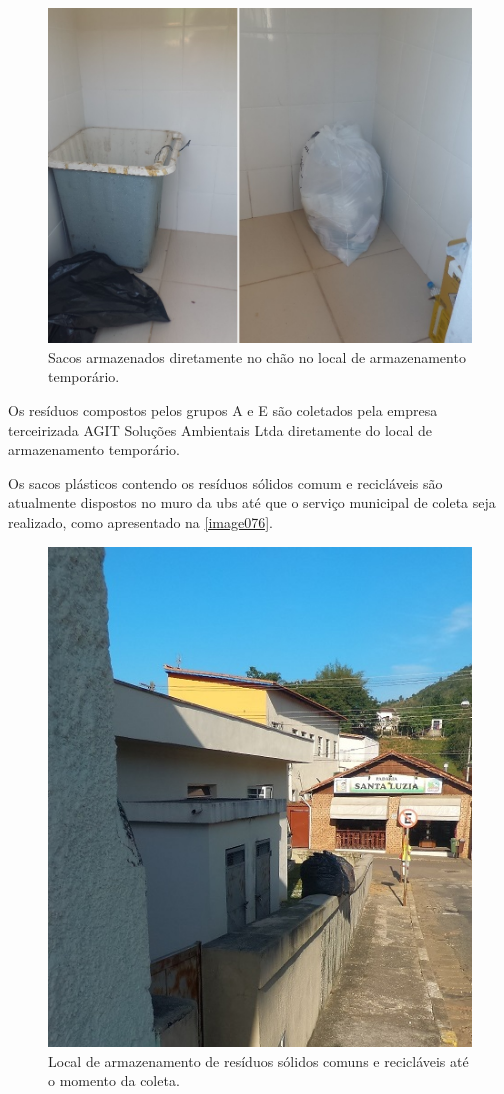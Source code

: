	\begin{figure}
		\centering
		\includegraphics[width=0.75\linewidth]{produtos/prodtres/image074_75}
		\caption{Sacos armazenados diretamente no chão no local de armazenamento temporário.}
		\label{fig:image074_75}
	\end{figure}

	
	Os resíduos compostos pelos grupos A e E são coletados pela empresa terceirizada AGIT Soluções Ambientais Ltda diretamente do local de armazenamento temporário.
	
	Os sacos plásticos contendo os resíduos sólidos comum e recicláveis são atualmente dispostos no muro da \gls{ubs} até que o serviço municipal de coleta seja realizado, como apresentado na \autoref{image076}.
	
	\begin{figure}
		\centering
		\includegraphics[width=0.50\linewidth]{produtos/prodtres/image076}
		\caption{Local de armazenamento de resíduos sólidos comuns e recicláveis até o momento da coleta.}
		\label{fig:image076}
	\end{figure}
	
